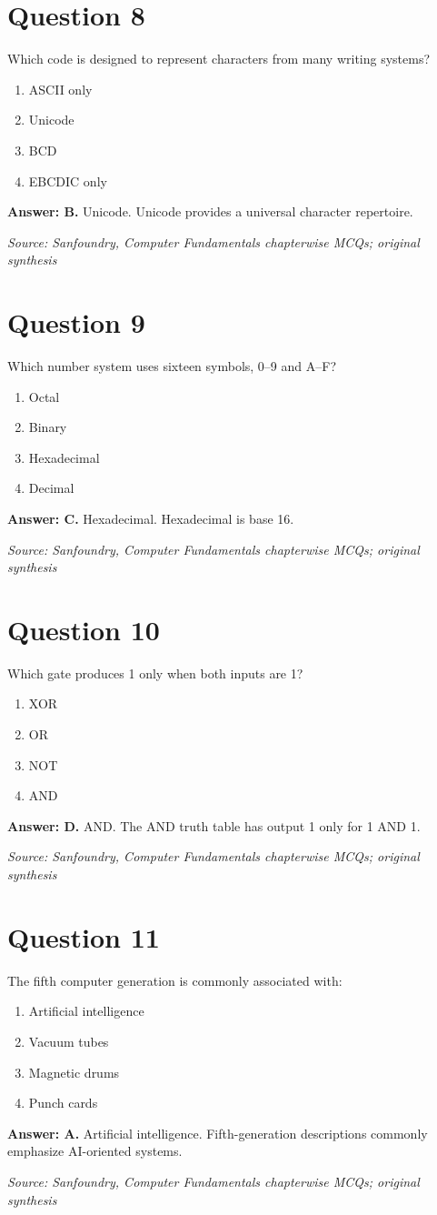 \documentclass[11pt,a4paper]{book}
\newcommand{\source}[1]{\par\smallskip\textit{Source: #1}}
\newcommand{\answer}[2]{\par\textbf{Answer: #1.} #2}
\begin{document}
\section*{Question 8}
Which code is designed to represent characters from many writing systems?
\begin{enumerate}[label=\Alph*.]
\item ASCII only
\item Unicode
\item BCD
\item EBCDIC only
\end{enumerate}
\answer{B}{Unicode. Unicode provides a universal character repertoire.}
\source{Sanfoundry, Computer Fundamentals chapterwise MCQs; original synthesis}
\section*{Question 9}
Which number system uses sixteen symbols, 0–9 and A–F?
\begin{enumerate}[label=\Alph*.]
\item Octal
\item Binary
\item Hexadecimal
\item Decimal
\end{enumerate}
\answer{C}{Hexadecimal. Hexadecimal is base 16.}
\source{Sanfoundry, Computer Fundamentals chapterwise MCQs; original synthesis}
\section*{Question 10}
Which gate produces 1 only when both inputs are 1?
\begin{enumerate}[label=\Alph*.]
\item XOR
\item OR
\item NOT
\item AND
\end{enumerate}
\answer{D}{AND. The AND truth table has output 1 only for 1 AND 1.}
\source{Sanfoundry, Computer Fundamentals chapterwise MCQs; original synthesis}
\section*{Question 11}
The fifth computer generation is commonly associated with:
\begin{enumerate}[label=\Alph*.]
\item Artificial intelligence
\item Vacuum tubes
\item Magnetic drums
\item Punch cards
\end{enumerate}
\answer{A}{Artificial intelligence. Fifth-generation descriptions commonly emphasize AI-oriented systems.}
\source{Sanfoundry, Computer Fundamentals chapterwise MCQs; original synthesis}
\end{document}

